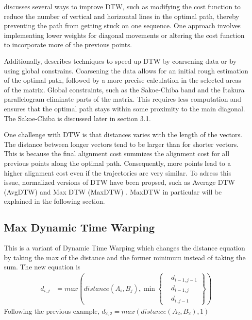 \textcite{muller2007dynamic} discusses several ways to improve DTW, such as modifying the cost function to reduce the number of vertical and horizontal lines in the optimal path, thereby preventing the path from getting stuck on one sequence. One approach involves implementing lower weights for diagonal movements or altering the cost function to incorporate more of the previous points.

Additionally, \textcite{muller2007dynamic} describes techniques to speed up DTW by coarsening data or by using global constrains. Coarsening the data allows for an initial rough estimation of the optimal path, followed by a more precise calculation in the selected areas of the matrix. Global constraints, such as the Sakoe-Chiba band and the Itakura parallelogram eliminate parts of the matrix. This requires less computation and ensures that the optimal path stays within some proximity to the main diagonal. The Sakoe-Chiba is discussed later in section 3.1.

One challenge with DTW is that distances varies with the length of the vectors. The distance between longer vectors tend to be larger than for shorter vectors. This is because the final alignment cost summizes the alignment cost for all previous points along the optimal path. Consequently, more points lead to a higher alignment cost even if the trajectories are very similar. To adress this issue, normalized versions of DTW have been propsed, such as Average DTW (AvgDTW) and Max DTW (MaxDTW) \cite{zhao2018rest}. MaxDTW in particular will be explained in the following section.



\subsection{Max Dynamic Time Warping}
This is a variant of Dynamic Time Warping which changes the distance equation by taking the max of the distance and the former minimum instead of taking the sum. The new equation is \begin{equation}
    \label{eq:max_dtw}
    \begin{aligned}
        d_{i, j} & = max(distance(A_{i}, B_{j}), \min \left\{ \begin{aligned}
                                                                   & d_{i-1, j-1} \\
                                                                   & d_{i-1, j}   \\
                                                                   & d_{i, j-1}
                                                              \end{aligned} \right\})
    \end{aligned}
\end{equation}
Following the previous example, $d_{2, 2} = max(distance(A_{2}, B_{2}), 1)$

